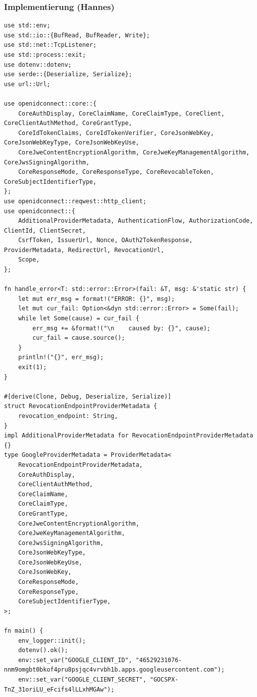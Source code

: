 \documentclass[notitlepage, hidelinks]{article}
\begin{document}
\subsubsection{Implementierung (Hannes)}
\begin{lstlisting}[language={[Sharp]C},frame=single,caption=OAuth2 und OICD in Rust,label=owaspfivegood]
use std::env;
use std::io::{BufRead, BufReader, Write};
use std::net::TcpListener;
use std::process::exit;
use dotenv::dotenv;
use serde::{Deserialize, Serialize};
use url::Url;

use openidconnect::core::{
    CoreAuthDisplay, CoreClaimName, CoreClaimType, CoreClient, CoreClientAuthMethod, CoreGrantType,
    CoreIdTokenClaims, CoreIdTokenVerifier, CoreJsonWebKey, CoreJsonWebKeyType, CoreJsonWebKeyUse,
    CoreJweContentEncryptionAlgorithm, CoreJweKeyManagementAlgorithm, CoreJwsSigningAlgorithm,
    CoreResponseMode, CoreResponseType, CoreRevocableToken, CoreSubjectIdentifierType,
};
use openidconnect::reqwest::http_client;
use openidconnect::{
    AdditionalProviderMetadata, AuthenticationFlow, AuthorizationCode, ClientId, ClientSecret,
    CsrfToken, IssuerUrl, Nonce, OAuth2TokenResponse, ProviderMetadata, RedirectUrl, RevocationUrl,
    Scope,
};

fn handle_error<T: std::error::Error>(fail: &T, msg: &'static str) {
    let mut err_msg = format!("ERROR: {}", msg);
    let mut cur_fail: Option<&dyn std::error::Error> = Some(fail);
    while let Some(cause) = cur_fail {
        err_msg += &format!("\n    caused by: {}", cause);
        cur_fail = cause.source();
    }
    println!("{}", err_msg);
    exit(1);
}

#[derive(Clone, Debug, Deserialize, Serialize)]
struct RevocationEndpointProviderMetadata {
    revocation_endpoint: String,
}
impl AdditionalProviderMetadata for RevocationEndpointProviderMetadata {}
type GoogleProviderMetadata = ProviderMetadata<
    RevocationEndpointProviderMetadata,
    CoreAuthDisplay,
    CoreClientAuthMethod,
    CoreClaimName,
    CoreClaimType,
    CoreGrantType,
    CoreJweContentEncryptionAlgorithm,
    CoreJweKeyManagementAlgorithm,
    CoreJwsSigningAlgorithm,
    CoreJsonWebKeyType,
    CoreJsonWebKeyUse,
    CoreJsonWebKey,
    CoreResponseMode,
    CoreResponseType,
    CoreSubjectIdentifierType,
>;

fn main() {
    env_logger::init();
    dotenv().ok();
    env::set_var("GOOGLE_CLIENT_ID", "46529231076-nnm9omgbt0bkof4pru8psjqc4vrvbh1b.apps.googleusercontent.com");
    env::set_var("GOOGLE_CLIENT_SECRET", "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");



\end{lstlisting}
\end{document}
